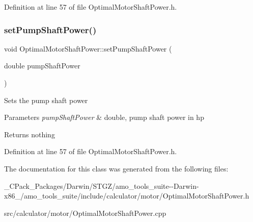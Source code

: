 Definition at line 57 of file Optimal\+Motor\+Shaft\+Power.\+h.

\mbox{\label{class_optimal_motor_shaft_power_ab2d80927fbaa62705359700b2a8f2f26}} 
\subsubsection{\texorpdfstring{set\+Pump\+Shaft\+Power()}{setPumpShaftPower()}\hspace{0.1cm}{\footnotesize\ttfamily [3/3]}}
{\footnotesize\ttfamily void Optimal\+Motor\+Shaft\+Power\+::set\+Pump\+Shaft\+Power (\begin{DoxyParamCaption}\item[{double}]{pump\+Shaft\+Power }\end{DoxyParamCaption})\hspace{0.3cm}{\ttfamily [inline]}}

Sets the pump shaft power


\begin{DoxyParams}{Parameters}
{\em pump\+Shaft\+Power} & double, pump shaft power in hp\\
\hline
\end{DoxyParams}
\begin{DoxyReturn}{Returns}
nothing 
\end{DoxyReturn}


Definition at line 57 of file Optimal\+Motor\+Shaft\+Power.\+h.



The documentation for this class was generated from the following files\+:\begin{DoxyCompactItemize}
\item 
\+\_\+\+C\+Pack\+\_\+\+Packages/\+Darwin/\+S\+T\+G\+Z/amo\+\_\+tools\+\_\+suite-\/-\/\+Darwin-\/x86\+\_/amo\+\_\+tools\+\_\+suite/include/calculator/motor/Optimal\+Motor\+Shaft\+Power.\+h\item 
src/calculator/motor/Optimal\+Motor\+Shaft\+Power.\+cpp\end{DoxyCompactItemize}
